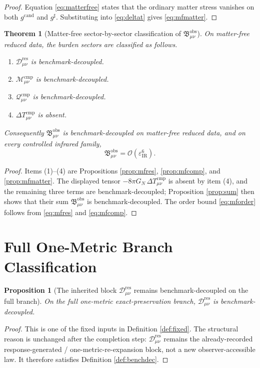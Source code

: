 \documentclass[11pt]{article}
\newcommand{\CandidateMetric}{g^{\mathrm{cand}}}
\newcommand{\CompletedMetric}{g^{\sharp}}
\newcommand{\ResidualDec}{\mathcal D_{\mu\nu}^{\mathrm{res}}}
\newcommand{\CompMix}{\mathcal M_{\mu\nu}^{\mathrm{cmp}}}
\newcommand{\CompQuad}{\mathcal Q_{\mu\nu}^{\mathrm{cmp}}}
\newcommand{\DeltaTComp}{\Delta T_{\mu\nu}^{\mathrm{cmp}}}
\newcommand{\ObsBurden}{\mathfrak B_{\mu\nu}^{\mathrm{obs}}}
\newcommand{\epsIR}{\varepsilon_{\mathrm{IR}}}
\newtheorem{proposition}{Proposition}
\newtheorem{theorem}{Theorem}
\begin{document}
\begin{proof}
Equation \eqref{eq:matterfree} states that the ordinary matter stress vanishes on both \(\CandidateMetric\) and \(\CompletedMetric\). Substituting into \eqref{eq:deltat} gives \eqref{eq:mfmatter}.
\end{proof}

\begin{theorem}[Matter-free sector-by-sector classification of \(\ObsBurden\)]
\label{thm:matterfree}
On matter-free reduced data, the burden sectors are classified as follows.
\begin{enumerate}
    \item \(\ResidualDec\) is benchmark-decoupled.
    \item \(\CompMix\) is benchmark-decoupled.
    \item \(\CompQuad\) is benchmark-decoupled.
    \item \(\DeltaTComp\) is absent.
\end{enumerate}
Consequently \(\ObsBurden\) is benchmark-decoupled on matter-free reduced data, and on every controlled infrared family,
\begin{equation}
\ObsBurden=\mathcal O(\epsIR^6).
\label{eq:mforder}
\end{equation}
\end{theorem}

\begin{proof}
Items (1)--(4) are Propositions \ref{prop:mfres}, \ref{prop:mfcomp}, and \ref{prop:mfmatter}. The displayed tensor \(-8\pi G_N\,\DeltaTComp\) is absent by item (4), and the remaining three terms are benchmark-decoupled; Proposition \ref{prop:sum} then shows that their sum \(\ObsBurden\) is benchmark-decoupled. The order bound \eqref{eq:mforder} follows from \eqref{eq:mfres} and \eqref{eq:mfcomp}.
\end{proof}

\section{Full One-Metric Branch Classification}

\begin{proposition}[The inherited block \(\ResidualDec\) remains benchmark-decoupled on the full branch]
\label{prop:fullres}
On the full one-metric exact-preservation branch, \(\ResidualDec\) is benchmark-decoupled.
\end{proposition}

\begin{proof}
This is one of the fixed inputs in Definition \ref{def:fixed}. The structural reason is unchanged after the completion step: \(\ResidualDec\) remains the already-recorded response-generated / one-metric-re-expansion block, not a new observer-accessible law. It therefore satisfies Definition \ref{def:benchdec}.
\end{proof}
\end{document}
